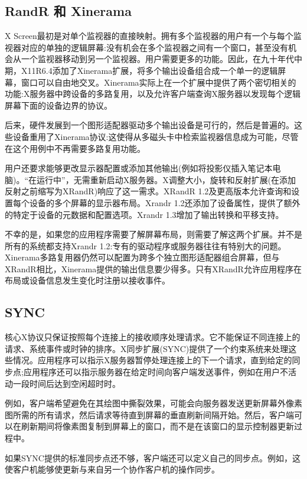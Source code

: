 \subsection{RandR 和 Xinerama}

X Screen最初是对单个监视器的直接映射。拥有多个监视器的用户有一个与每个监视器对应的单独的逻辑屏幕:没有机会在多个监视器之间有一个窗口，甚至没有机会从一个监视器移动到另一个监视器。用户需要更多的功能。因此，在九十年代中期，X11R6.4添加了Xinerama扩展，将多个输出设备组合成一个单一的逻辑屏幕，窗口可以自由地交叉。Xinerama实际上在一个扩展中提供了两个密切相关的功能:X服务器中跨设备的多路复用，以及允许客户端查询X服务器以发现每个逻辑屏幕下面的设备边界的协议。

后来，硬件发展到一个图形适配器驱动多个输出设备是可行的，然后是普遍的。这些设备重用了Xinerama协议:这使得从多磁头卡中检索监视器信息成为可能，尽管在这个用例中不再需要多路复用功能。

用户还要求能够更改显示器配置或添加其他输出(例如将投影仪插入笔记本电脑)。“在运行中”，无需重新启动X服务器。X调整大小，旋转和反射扩展(在添加反射之前缩写为XRandR)响应了这一需求。XRandR 1.2及更高版本允许查询和设置每个设备的多个屏幕的显示器布局。Xrandr 1.2还添加了设备属性，提供了额外的特定于设备的元数据和配置选项。Xrandr 1.3增加了输出转换和平移支持。

不幸的是，如果您的应用程序需要了解屏幕布局，则需要了解这两个扩展。并不是所有的系统都支持Xrandr 1.2:专有的驱动程序或服务器往往有特别大的问题。Xinerama多路复用器仍然可以配置为跨多个独立图形适配器组合屏幕，但与XRandR相比，Xinerama提供的输出信息要少得多。只有XRandR允许应用程序在布局或设备信息发生变化时注册以接收事件。

\subsection{SYNC}

核心X协议只保证按照每个连接上的接收顺序处理请求。它不能保证不同连接上的请求、系统事件或时钟的排序。X同步扩展(SYNC)提供了一个约束系统来处理这些情况。应用程序可以指示X服务器暂停处理连接上的下一个请求，直到给定的同步点;应用程序还可以指示服务器在给定时间向客户端发送事件，例如在用户不活动一段时间后达到空闲超时时。

例如，客户端希望避免在其绘图中撕裂效果，可能会向服务器发送更新屏幕外像素图所需的所有请求，然后请求等待直到屏幕的垂直刷新间隔开始。然后，客户端可以在刷新期间将像素图复制到屏幕上的窗口，而不是在该窗口的显示控制器更新过程中。

如果SYNC提供的标准同步点还不够，客户端还可以定义自己的同步点。例如，这使客户机能够使更新与来自另一个协作客户机的操作同步。


